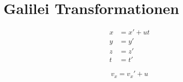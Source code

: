 \chapter{Galilei Transformationen}
\label{sec:GalileiTransformationen}

\lipsum

\begin{align}
\tag{G.1}\label{eq:Gx}	x &= x'+ut\\
\tag{G.2}\label{eq:Gy}	y &= y'\\
\tag{G.3}\label{eq:Gz}	z &=z'\\
\tag{G.4}\label{eq:Gt}	t &= t'
\end{align}


\begin{equation}
	\label{eq:Gv}\tag{G.5} v_x = v_x'+u
\end{equation}